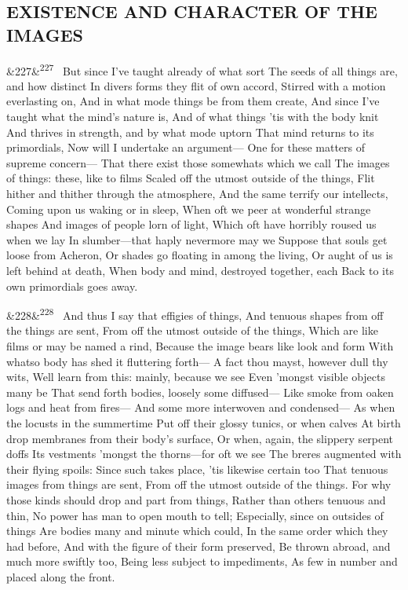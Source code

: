 \documentclass[12pt]{article}
\newcommand{\para}[1][]{\par\noindent\ifx&#1&\else\textsuperscript{\footnotesize #1}~\fi}
\begin{document}
\subsection*{EXISTENCE AND CHARACTER OF THE IMAGES}

\para[227] But since I've taught already of what sort The seeds of all things are, and how distinct In divers forms they flit of own accord, Stirred with a motion everlasting on, And in what mode things be from them create, And since I've taught what the mind's nature is, And of what things 'tis with the body knit And thrives in strength, and by what mode uptorn That mind returns to its primordials, Now will I undertake an argument--- One for these matters of supreme concern--- That there exist those somewhats which we call The images of things: these, like to films Scaled off the utmost outside of the things, Flit hither and thither through the atmosphere, And the same terrify our intellects, Coming upon us waking or in sleep, When oft we peer at wonderful strange shapes And images of people lorn of light, Which oft have horribly roused us when we lay In slumber---that haply nevermore may we Suppose that souls get loose from Acheron, Or shades go floating in among the living, Or aught of us is left behind at death, When body and mind, destroyed together, each Back to its own primordials goes away.

\para[228] And thus I say that effigies of things, And tenuous shapes from off the things are sent, From off the utmost outside of the things, Which are like films or may be named a rind, Because the image bears like look and form With whatso body has shed it fluttering forth--- A fact thou mayst, however dull thy wits, Well learn from this: mainly, because we see Even 'mongst visible objects many be That send forth bodies, loosely some diffused--- Like smoke from oaken logs and heat from fires--- And some more interwoven and condensed--- As when the locusts in the summertime Put off their glossy tunics, or when calves At birth drop membranes from their body's surface, Or when, again, the slippery serpent doffs Its vestments 'mongst the thorns---for oft we see The breres augmented with their flying spoils: Since such takes place, 'tis likewise certain too That tenuous images from things are sent, From off the utmost outside of the things. For why those kinds should drop and part from things, Rather than others tenuous and thin, No power has man to open mouth to tell; Especially, since on outsides of things Are bodies many and minute which could, In the same order which they had before, And with the figure of their form preserved, Be thrown abroad, and much more swiftly too, Being less subject to impediments, As few in number and placed along the front.
\end{document}

